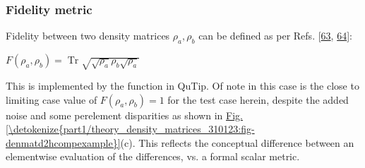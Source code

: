 \documentclass[letterpaper,table,10pt,english]{jupyterBook}
\begin{document}
\subsubsection{Fidelity metric}
\label{\detokenize{part1/theory_density_matrices_310123:fidelity-metric}}
\sphinxAtStartPar
Fidelity between two density matrices \(\rho_{a},\rho_{b}\) can be defined as per Refs. {[}\hyperlink{cite.backmatter/bibliography:id471}{63}, \hyperlink{cite.backmatter/bibliography:id727}{64}{]}:

\sphinxAtStartPar
\(F(\rho_{a},\rho_{b})=\operatorname{Tr} {\sqrt {{\sqrt {\rho_{a}}}\rho_{b} {\sqrt {\rho_{a}}}}}\)

\sphinxAtStartPar
This is implemented by the  function in QuTip. Of note in this case is the close to limiting case value of \(F(\rho_{a},\rho_{b})=1\) for the test case herein, despite the added noise and some per\sphinxhyphen{}element disparities as shown in   \hyperref[\detokenize{part1/theory_density_matrices_310123:fig-denmatd2hcompexample}]{Fig.\@ \ref{\detokenize{part1/theory_density_matrices_310123:fig-denmatd2hcompexample}}}(c). This reflects the conceptual difference between an element\sphinxhyphen{}wise evaluation of the differences, vs. a formal scalar metric.
\end{document}

